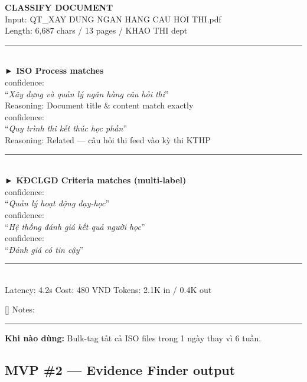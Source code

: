 \documentclass[11pt,a4paper]{article}
\begin{document}
\begin{mockbox}
{\bfseries\color{ink} CLASSIFY DOCUMENT}\\[2pt]
{\color{mid} Input: }QT\_XAY DUNG NGAN HANG CAU HOI THI.pdf\\
{\color{mid} Length: }6,687 chars / 13 pages / KHAO THI dept\\[6pt]
\rule{\linewidth}{0.3pt}\\[4pt]
{\bfseries\color{ink} ► ISO Process matches}\\[2pt]
 \quad confidence: \\
\quad ``\textit{Xây dựng và quản lý ngân hàng câu hỏi thi}''\\
\quad \textcolor{mid}{Reasoning: Document title \& content match exactly}\\[3pt]
 \quad confidence: \\
\quad ``\textit{Quy trình thi kết thúc học phần}''\\
\quad \textcolor{mid}{Reasoning: Related — câu hỏi thi feed vào kỳ thi KTHP}\\[6pt]
\rule{\linewidth}{0.3pt}\\[4pt]
{\bfseries\color{ink} ► KĐCLGD Criteria matches (multi-label)}\\[2pt]
 \quad confidence: \\
\quad ``\textit{Quản lý hoạt động dạy-học}''\\[3pt]
 \quad confidence: \\
\quad ``\textit{Hệ thống đánh giá kết quả người học}''\\[3pt]
 \quad confidence: \\
\quad ``\textit{Đánh giá có tin cậy}''\\[6pt]
\rule{\linewidth}{0.3pt}\\[4pt]
\textcolor{mid}{Latency: 4.2s \quad Cost: 480 VND \quad Tokens: 2.1K in / 0.4K out}\\[4pt]
{[]   \quad Notes: \rule{4cm}{0.3pt}}
\end{mockbox}

\textbf{Khi nào dùng:} Bulk-tag tất cả ISO files trong 1 ngày thay vì 6 tuần.

\subsection{MVP \#2 — Evidence Finder output}
\end{document}
